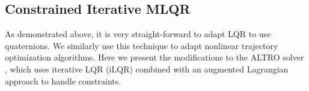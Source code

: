 \documentclass{svproc}
\newcommand{\half}{\frac{1}{2}}
\newcommand{\R}{\mathbb{R}}
\begin{document}
    
    
 
    
    \subsection{Constrained Iterative MLQR}
        As demonstrated above, it is very straight-forward to adapt LQR to use quaternions. We similarly use this technique to adapt nonlinear trajectory optimization algorithms. Here we present the modifications to the ALTRO solver \cite{howell2019altro}, which uses iterative LQR (iLQR) combined with an augmented Lagrangian approach to handle constraints. 
        
\end{document}
